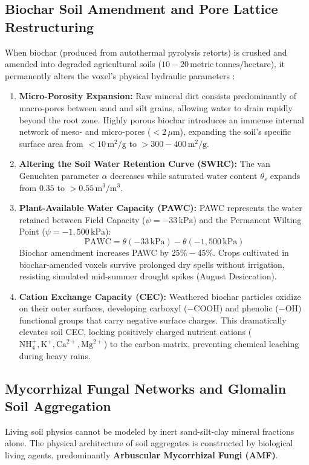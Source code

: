 \subsection{Biochar Soil Amendment and Pore Lattice Restructuring}
When biochar (produced from autothermal pyrolysis retorts) is crushed and amended into degraded agricultural soils ($10 - 20\,\mathrm{metric\ tonnes/hectare}$), it permanently alters the voxel's physical hydraulic parameters \cite{lehmann2015biochar}:
\begin{enumerate}
    \item \textbf{Micro-Porosity Expansion:} Raw mineral dirt consists predominantly of macro-pores between sand and silt grains, allowing water to drain rapidly beyond the root zone. Highly porous biochar introduces an immense internal network of meso- and micro-pores ($<2\,\mu\mathrm{m}$), expanding the soil's specific surface area from $<10\,\mathrm{m^2/g}$ to $>300 - 400\,\mathrm{m^2/g}$.
    \item \textbf{Altering the Soil Water Retention Curve (SWRC):} The van Genuchten parameter $\alpha$ decreases while saturated water content $\theta_s$ expands from $0.35$ to $>0.55\,\mathrm{m^3/m^3}$.
    \item \textbf{Plant-Available Water Capacity (PAWC):} PAWC represents the water retained between Field Capacity ($\psi = -33\,\mathrm{kPa}$) and the Permanent Wilting Point ($\psi = -1{,}500\,\mathrm{kPa}$):
    \begin{equation}
    \mathrm{PAWC} = \theta(-33\,\mathrm{kPa}) - \theta(-1{,}500\,\mathrm{kPa})
    \label{eq:pawc_definition}
    \end{equation}
    Biochar amendment increases PAWC by $25\% - 45\%$. Crops cultivated in biochar-amended voxels survive prolonged dry spells without irrigation, resisting simulated mid-summer drought spikes (August Desiccation).
    \item \textbf{Cation Exchange Capacity (CEC):} Weathered biochar particles oxidize on their outer surfaces, developing carboxyl ($\mathrm{-COOH}$) and phenolic ($\mathrm{-OH}$) functional groups that carry negative surface charges. This dramatically elevates soil CEC, locking positively charged nutrient cations ($\mathrm{NH}_4^+, \mathrm{K}^+, \mathrm{Ca}^{2+}, \mathrm{Mg}^{2+}$) to the carbon matrix, preventing chemical leaching during heavy rains.
\end{enumerate}

\subsection{Mycorrhizal Fungal Networks and Glomalin Soil Aggregation}
Living soil physics cannot be modeled by inert sand-silt-clay mineral fractions alone. The physical architecture of soil aggregates is constructed by biological living agents, predominantly \textbf{Arbuscular Mycorrhizal Fungi (AMF)}.

